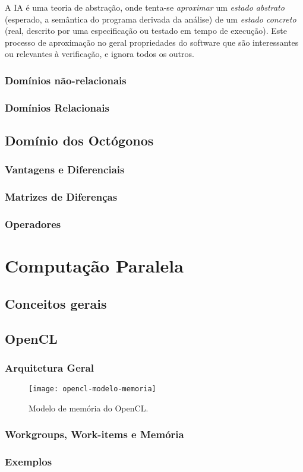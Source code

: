     A \gls{IA} é uma teoria de abstração, onde tenta-se \emph{aproximar} um 
    \emph{estado abstrato} (esperado, a semântica do programa derivada da 
    análise) de um \emph{estado concreto} (real, descrito por uma especificação 
    ou testado em tempo de execução). Este processo de aproximação no geral 
    propriedades do software que são interessantes ou relevantes à verificação, 
    e ignora todos os outros.
    
    
        \subsection{Domínios não-relacionais}
        \subsection{Domínios Relacionais}
        
        
    \section{Domínio dos Octógonos}
        \subsection{Vantagens e Diferenciais}
        \subsection{Matrizes de Diferenças}
        \subsection{Operadores}


\chapter{Computação Paralela} \label{fundamentacao_cl}
    \section{Conceitos gerais}
    \section{OpenCL}
        \subsection{Arquitetura Geral}
        \begin{figure}[t]
            \centering
            \caption{Modelo de memória do OpenCL.}
            \texttt{[image: opencl-modelo-memoria]}
        \end{figure}
        \subsection{Workgroups, Work-items e Memória}
        \subsection{Exemplos}
        